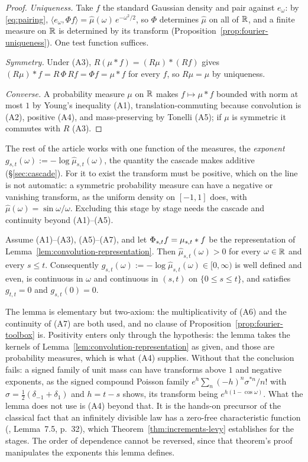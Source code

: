 \begin{proof}
\emph{Uniqueness.} Take $f$ the standard Gaussian density and pair against $e_\omega$: by
\ref{eq:pairing}, $\langle e_\omega, \Phi f\rangle = \hat\mu(\omega)\,e^{-\omega^2/2}$, so
$\Phi$ determines $\hat\mu$ on all of $\mathbb{R}$, and a finite measure on $\mathbb{R}$ is determined by its
transform (Proposition~\ref{prop:fourier-uniqueness}). One test function suffices.

\emph{Symmetry.} Under (A3), $R(\mu * f) = (R\mu) * (Rf)$ gives
$(R\mu) * f = R\,\Phi\,R f = \Phi f = \mu * f$ for every $f$, so $R\mu = \mu$ by uniqueness.

\emph{Converse.} A probability measure $\mu$ on $\mathbb{R}$ makes $f \mapsto \mu * f$ bounded with
norm at most $1$ by Young's inequality (A1), translation-commuting because convolution is
(A2), positive (A4), and mass-preserving by Tonelli (A5); if $\mu$ is symmetric it commutes
with $R$ (A3).
\end{proof}

The rest of the article works with one function of the measures, the \emph{exponent}
$g_{s,t}(\omega) := -\log\hat\mu_{s,t}(\omega)$, the quantity the cascade makes additive
(\S\ref{sec:cascade}). For it to exist the transform must be positive, which on the line is
not automatic: a symmetric probability measure can have a negative or vanishing transform,
as the uniform density on $[-1,1]$ does, with $\hat\mu(\omega) = \sin\omega/\omega$.
Excluding this stage by stage needs the cascade and continuity beyond (A1)--(A5).

\begin{lemma}\label{lem:nonvanishing}
Assume (A1)--(A3), (A5)--(A7), and let $\Phi_{s,t}f = \mu_{s,t} * f$ be the representation of
Lemma~\ref{lem:convolution-representation}. Then $\hat\mu_{s,t}(\omega) > 0$ for every
$\omega \in \mathbb{R}$ and every $s \le t$. Consequently
$g_{s,t}(\omega) := -\log\hat\mu_{s,t}(\omega) \in [0,\infty)$ is well defined and even, is
continuous in $\omega$ and continuous in $(s,t)$ on $\{0 \le s \le t\}$, and satisfies
$g_{t,t} = 0$ and $g_{s,t}(0) = 0$.
\end{lemma}

The lemma is elementary but two-axiom: the multiplicativity of (A6) and the
continuity of (A7) are both used, and no clause of Proposition~\ref{prop:fourier-toolbox}
is. Positivity enters only through the hypothesis: the lemma takes the kernels of
Lemma~\ref{lem:convolution-representation} as given, and those are probability measures,
which is what (A4) supplies. Without that the conclusion fails: a signed family of unit
mass can have transforms above $1$ and negative exponents, as the signed compound Poisson
family $e^{h}\sum_n (-h)^n\sigma^{*n}/n!$ with $\sigma = \tfrac12(\delta_{-1}+\delta_1)$ and
$h = t - s$ shows, its transform being $e^{h(1-\cos\omega)}$. What the lemma does not use is
(A4) beyond that. It is the hands-on precursor of the classical fact that an
infinitely divisible law has a zero-free characteristic function (,
Lemma~7.5, p.~32), which Theorem~\ref{thm:increments-levy} establishes for the stages.
The order of dependence cannot be reversed, since that theorem's proof
manipulates the exponents this lemma defines.

